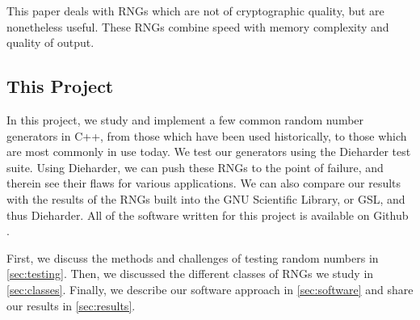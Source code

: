 This paper deals with RNGs which are not of cryptographic quality, but are nonetheless useful. These RNGs combine speed with memory complexity and quality of output.

\subsection{This Project}
In this project, we study and implement a few common random number generators in C++, from those which have been used historically, to those which are most commonly in use today. We test our generators using the Dieharder test suite. Using Dieharder, we can push these RNGs to the point of failure, and therein see their flaws for various applications. We can also compare our results with the results of the RNGs built into the GNU Scientific Library, or GSL, and thus Dieharder. All of the software written for this project is available on Github \cite{github_repo}.

First, we discuss the methods and challenges of testing random numbers in \ref{sec:testing}. Then, we discussed the different classes of RNGs we study in \ref{sec:classes}. Finally, we describe our software approach in \ref{sec:software} and share our results in \ref{sec:results}.
